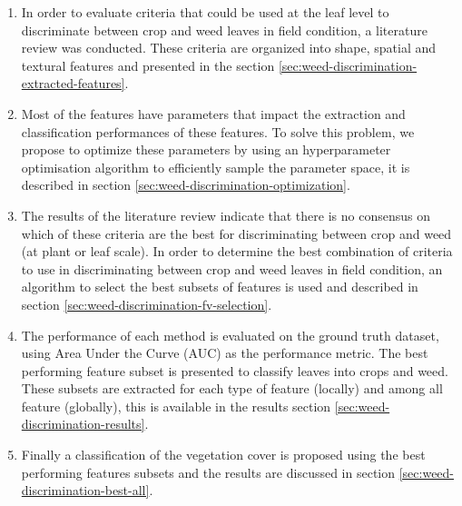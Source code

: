 \documentclass[../thesis.tex]{subfiles}
\begin{document}
    \begin{enumerate}
        \item In order to evaluate criteria that could be used at the leaf level to discriminate between crop and weed leaves in field condition, a literature review was conducted. These criteria are organized into shape, spatial and textural features and presented in the section \ref{sec:weed-discrimination-extracted-features}.
        
        \item Most of the features have parameters that impact the extraction and classification performances of these features. To solve this problem, we propose to optimize these parameters by using an hyperparameter optimisation algorithm to efficiently sample the parameter space, it is described in section \ref{sec:weed-discrimination-optimization}.
        
        \item The results of the literature review indicate that there is no consensus on which of these criteria are the best for discriminating between crop and weed (at plant or leaf scale). In order to determine the best combination of criteria to use in discriminating between crop and weed leaves in field condition, an algorithm to select the best subsets of features is used and described in section \ref{sec:weed-discrimination-fv-selection}.
        
        \item The performance of each method is evaluated on the ground truth dataset, using Area Under the Curve (AUC) as the performance metric. The best performing feature subset is presented to classify leaves into crops and weed. These subsets are extracted for each type of feature (locally) and among all feature (globally), this is available in the results section \ref{sec:weed-discrimination-results}.
        
        \item Finally a classification of the vegetation cover is proposed using the best performing features subsets and the results are discussed in section \ref{sec:weed-discrimination-best-all}.
    \end{enumerate}
    
    
\end{document}
